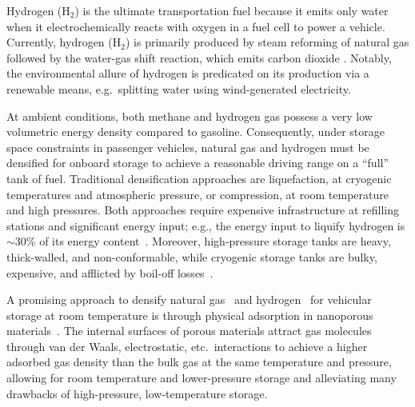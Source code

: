 \documentclass[twoside,twocolumn,9pt]{article}
\begin{document}
Hydrogen (H$_2$) is the ultimate transportation fuel because it emits only
water when it electrochemically reacts with oxygen in a fuel cell to power a
vehicle. Currently, hydrogen (H$_2$) is primarily produced by steam reforming
of natural gas followed by the water-gas shift reaction, which emits carbon
dioxide \cite{crabtree2004hydrogen}. Notably, the environmental allure of
hydrogen is predicated on its production via a renewable means, e.g.\ splitting
water using wind-generated electricity.


At ambient conditions, both methane and hydrogen gas possess a very low
volumetric energy density compared to gasoline. Consequently, under storage
space constraints in passenger vehicles, natural gas and hydrogen must be
densified for onboard storage to achieve a reasonable driving range on a
``full'' tank of fuel. Traditional densification approaches are liquefaction,
at cryogenic temperatures and atmospheric pressure, or compression, at room
temperature and high pressures. Both approaches require expensive
infrastructure at refilling stations and significant energy input; e.g., the
energy input to liquify hydrogen is $\sim$30\% of its energy
content~\cite{bossel2003energy}. Moreover, high-pressure storage tanks are
heavy, thick-walled, and non-conformable, while cryogenic storage tanks are
bulky, expensive, and afflicted by boil-off losses~\cite{hasan2009minimizing}.

A promising approach to densify natural
gas~\cite{makal2012methane,mason2014evaluating} and
hydrogen~\cite{suh2011hydrogen,garcia2018benchmark} for vehicular storage at
room temperature is through physical adsorption in nanoporous
materials~\cite{schoedel2016role}. The internal surfaces of porous materials
attract gas molecules through van der Waals, electrostatic, etc.\ interactions
to achieve a higher adsorbed gas density than the bulk gas at the same
temperature and pressure, allowing for room temperature and lower-pressure
storage and alleviating many drawbacks of high-pressure, low-temperature
storage.
\end{document}
